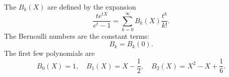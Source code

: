 The  $B_k(X)$ are defined by the expansion
$$
\frac{t e^{tX}}{e^t - 1} = \sum_{k=0}^{\infty} B_k(X) \frac{t^k}{k!}.
$$
The Bernoulli numbers are the constant terms:
$$
B_k = B_k(0).
$$
The first few polynomials are
$$
B_0(X) = 1,\quad B_1(X) = X - \frac{1}{2},\quad B_2(X) = X^2 - X + \frac{1}{6}.
$$
